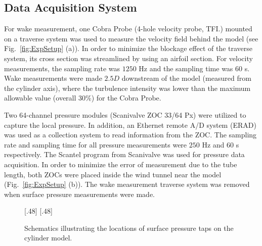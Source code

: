 \subsection{Data Acquisition System}
\label{sec:data_acquisition}
%
For wake measurement, one Cobra Probe (4-hole velocity probe,
TFI\textsuperscript{\textregistered}.) mounted on a traverse system was used to
measure the velocity field behind the model (see Fig.~\ref{fig:ExpSetup} (a)).
In order to minimize the blockage effect of the traverse system, its cross
section was streamlined by using an airfoil section.  For velocity
measurements, the sampling rate was $1250$ Hz and the sampling time was $60$ s.
Wake measurements were made $2.5 D$ downstream of the model (measured from the
cylinder axis), where the turbulence intensity was lower than the maximum
allowable value (overall 30\%) for the Cobra Probe.  

Two 64-channel pressure modules (Scanivalve ZOC 33/64 Px) were utilized to
capture the local pressure. In addition, an Ethernet remote A/D system (ERAD)
was used as a collection system to read information from the ZOC. The sampling
rate and sampling time for all pressure measurements were $250$ Hz and $60$ s
respectively. The Scantel program from Scanivalve was used for pressure data
acquisition. In order to minimize the error of measurement due to the tube
length, both ZOCs were placed inside the wind tunnel near the model
(Fig.~\ref{fig:ExpSetup} (b)). The wake measurement traverse system was removed
when surface pressure measurements were made.
%
\begin{figure}[htb!]
  \centering
    [.48\linewidth]{}
  \hspace*{\fill}
    [.48\linewidth]{}
  \caption{Schematics illustrating the locations of surface pressure taps on
    the cylinder model.}
  \label{fig:experimentTaps}
\end{figure}
